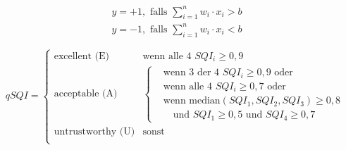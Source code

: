 	


\[
\begin{gathered}
	y = +1, \text{ falls } \sum_{i=1}^{n} w_i \cdot x_i > b \\
	y = -1, \text{ falls } \sum_{i=1}^{n} w_i \cdot x_i < b
\end{gathered}
\]

\[
qSQI = \begin{cases}
	\text{excellent (E)} & \text{wenn alle 4 } SQI_i \geq 0,9\\
	\text{acceptable (A)} & \begin{cases}
		& \text{wenn 3 der 4 } SQI_i \geq 0,9 \text{ oder}\\
		& \text{wenn alle 4 } SQI_i \geq 0,7 \text{ oder}\\
		& \text{wenn median}(SQI_1, SQI_2, SQI_3) \geq 0,8\\&\text{ }\text{	und } SQI_1 \geq 0,5 \text{ und } SQI_4 \geq 0,7
		\end{cases}\\
	\text{untrustworthy (U)} & \text{sonst}\\
\end{cases}
\]



